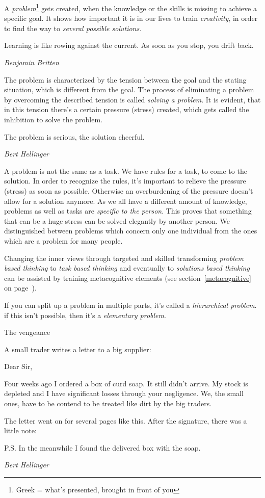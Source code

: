 \documentclass[../main.tex]{subfiles}
\begin{document}
A \emph{problem}\footnote{Greek = what's presented, brought in front of you} gets created, when the knowledge or the skills is missing to achieve a specific goal.
It shows how important it is in our lives to train \emph{creativity}, in order to find the way to \emph{several possible solutions}.

\epigraph{Learning is like rowing against the current. As soon as you stop, you drift back.}{\textit{Benjamin Britten}}

The problem is characterized by the tension between the goal and the stating situation, which is different from the goal.
The process of eliminating a problem by overcoming the described tension is called \emph{solving a problem}.
It is evident, that in this tension there's a certain pressure (stress) created, which gets called the inhibition to solve the problem.

\epigraph{The problem is serious, the solution cheerful.}{\textit{Bert Hellinger}}

A problem is not the same as a task. We have rules for a task, to come to the solution.
In order to recognize the rules, it's important to relieve the pressure (stress) as soon as possible. Otherwise an overburdening of the pressure doesn't allow for a solution anymore.
As we all have a different amount of knowledge, problems as well as tasks are \emph{specific to the person}. This proves that something that can be a huge stress can be solved elegantly by another person.
We distinguished between problems which concern only one individual from the ones which are a problem for many people.

Changing the inner views through targeted and skilled transforming \emph{problem based thinking} to \emph{task based thinking} and eventually to \emph{solutions based thinking} can be assisted by training metacognitive elements (see section~\ref{metacognitive} on page~\pageref{metacognitive}).

If you can split up a problem in multiple parts, it's called a \emph{hierarchical problem}. if this isn't possible, then it's a \emph{elementary problem}.

        \setlength{}
        \epigraph{The vengeance
          
          \vspace {5mm} \noindent A small trader writes a letter to a big supplier:
          
  Dear Sir,

  Four weeks ago I ordered a box of curd soap. It still didn't arrive. My stock is depleted and I have significant losses through your negligence. We, the small ones, have to be contend to be treated like dirt by the big traders.
  
  The letter went on for several pages like this. After the signature, there was a little note:
  
  P.S. In the meanwhile I found the delivered box with the soap.}{\textit{Bert Hellinger}}
        \setlength{}
\end{document}
